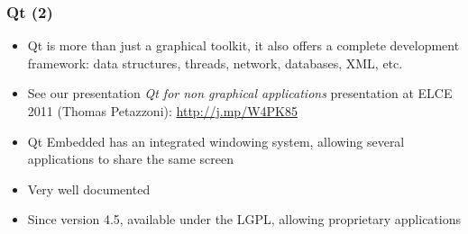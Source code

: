 \begin{frame}
  \frametitle{Qt (2)}
  \begin{itemize}
  \item Qt is more than just a graphical toolkit, it also offers a
    complete development framework: data structures, threads, network,
    databases, XML, etc.
  \item See our presentation {\em Qt for non graphical applications}
    presentation at ELCE 2011 (Thomas Petazzoni):
    \url{http://j.mp/W4PK85}
  \item Qt Embedded has an integrated windowing system, allowing
    several applications to share the same screen
  \item Very well documented
  \item Since version 4.5, available under the LGPL, allowing
    proprietary applications
  \end{itemize}
\end{frame}

